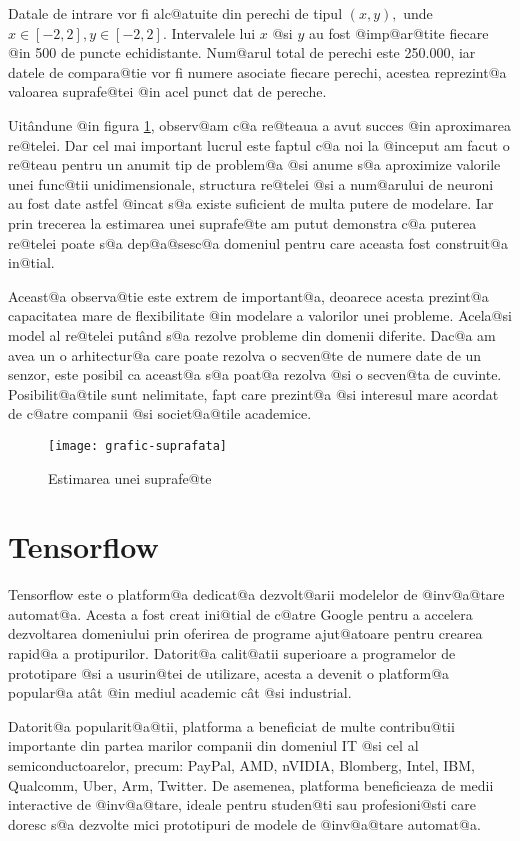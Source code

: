 Datale de intrare vor fi alc@atuite din perechi de tipul $(x, y),$ unde $x \in [-2, 2], y \in [-2, 2]$. Intervalele lui $x$ @si $y$ au fost @imp@ar@tite fiecare @in 500 de puncte echidistante. Num@arul total de perechi este 250.000, iar datele de compara@tie vor fi numere asociate fiecare perechi, acestea reprezint@a valoarea suprafe@tei @in acel punct dat de pereche. 

Uit\^ andune @in figura \ref{fig:grafic-suprafata}, observ@am c@a re@teaua a avut succes @in aproximarea re@telei. Dar cel mai important lucrul este faptul c@a noi la @inceput am facut o re@teau pentru un anumit tip de problem@a @si anume s@a aproximize valorile unei func@tii unidimensionale, structura re@telei @si a num@arului de neuroni au fost date astfel @incat s@a existe suficient de multa putere de modelare. Iar prin trecerea la estimarea unei suprafe@te am putut demonstra c@a puterea re@telei poate s@a dep@a@sesc@a domeniul pentru care aceasta fost construit@a in@tial.

Aceast@a observa@tie este extrem de important@a, deoarece acesta prezint@a capacitatea mare de flexibilitate @in modelare a valorilor unei probleme. Acela@si model al re@telei put\^ and s@a rezolve probleme din domenii diferite. Dac@a am avea un o arhitectur@a care poate rezolva o secven@te de numere date de un senzor, este posibil ca aceast@a s@a poat@a rezolva @si o secven@ta de cuvinte. Posibilit@a@tile sunt nelimitate, fapt care prezint@a @si interesul mare acordat de c@atre companii @si societ@a@tile academice.

\begin{figure}[H]
	\centering
	\texttt{[image: grafic-suprafata]}
	\caption{Estimarea unei suprafe@te}
	\label{fig:grafic-suprafata}
\end{figure}


\section{Tensorflow}
Tensorflow este o platform@a dedicat@a dezvolt@arii modelelor de @inv@a@tare automat@a. Acesta a fost creat ini@tial de c@atre Google pentru a accelera dezvoltarea domeniului prin oferirea de programe ajut@atoare pentru crearea rapid@a a protipurilor. Datorit@a calit@atii superioare a programelor de prototipare @si a usurin@tei de utilizare, acesta a devenit o platform@a popular@a at\^ at @in mediul academic c\^ at @si industrial.

Datorit@a popularit@a@tii, platforma a beneficiat de multe contribu@tii importante din partea marilor companii din domeniul IT @si cel al semiconductoarelor, precum: PayPal, AMD, nVIDIA, Blomberg, Intel, IBM, Qualcomm, Uber, Arm, Twitter. De asemenea, platforma beneficieaza de medii interactive de @inv@a@tare, ideale pentru studen@ti sau profesioni@sti care doresc s@a dezvolte mici prototipuri de modele de @inv@a@tare automat@a.

